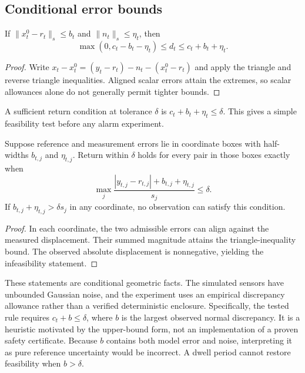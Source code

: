 \subsection{Conditional error bounds}
\begin{proposition}
If $\|x_t^0-r_t\|_s\le b_t$ and $\|n_t\|_s\le\eta_t$, then
\begin{equation}
 \max(0,c_t-b_t-\eta_t)\le d_t\le c_t+b_t+\eta_t.
 \label{eq:bound}
\end{equation}
\end{proposition}
\begin{proof}
Write $x_t-x_t^0=(y_t-r_t)-n_t-(x_t^0-r_t)$ and apply the triangle and reverse triangle inequalities. Aligned scalar errors attain the extremes, so scalar allowances alone do not generally permit tighter bounds.
\end{proof}

A sufficient return condition at tolerance $\delta$ is $c_t+b_t+\eta_t\le\delta$. This gives a simple feasibility test before any alarm experiment.
\begin{proposition}
Suppose reference and measurement errors lie in coordinate boxes with half-widths $b_{t,j}$ and $\eta_{t,j}$. Return within $\delta$ holds for every pair in those boxes exactly when
\begin{equation}
 \max_j\frac{|y_{t,j}-r_{t,j}|+b_{t,j}+\eta_{t,j}}{s_j}\le\delta.
 \label{eq:box}
\end{equation}
If $b_{t,j}+\eta_{t,j}>\delta s_j$ in any coordinate, no observation can satisfy this condition.
\end{proposition}
\begin{proof}
In each coordinate, the two admissible errors can align against the measured displacement. Their summed magnitude attains the triangle-inequality bound. The observed absolute displacement is nonnegative, yielding the infeasibility statement.
\end{proof}

These statements are conditional geometric facts. The simulated sensors have unbounded Gaussian noise, and the experiment uses an empirical discrepancy allowance rather than a verified deterministic enclosure. Specifically, the tested rule requires $c_t+b\le\delta$, where $b$ is the largest observed normal discrepancy. It is a heuristic motivated by the upper-bound form, not an implementation of a proven safety certificate. Because $b$ contains both model error and noise, interpreting it as pure reference uncertainty would be incorrect. A dwell period cannot restore feasibility when $b>\delta$.

